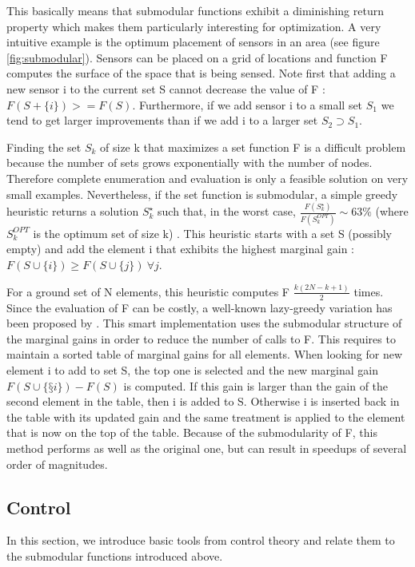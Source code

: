 \documentclass[conference]{IEEEtran}
\begin{document}
This basically means that submodular functions exhibit a diminishing return property which makes them particularly interesting for optimization. A very intuitive example is the optimum placement of sensors in an area (see figure \ref{fig:submodular}). Sensors can be placed on a grid of locations and function F computes the surface of the space that is being sensed. Note first that adding a new sensor i to the current set S cannot decrease the value of F : $F(S+\{i\})>=F(S)$. Furthermore, if we add sensor i to a small set $S_1$ we tend to get larger improvements than if we add i to a larger set $S_2 \supset S_1$.

Finding the set $ S_k $ of size k that maximizes a set function F is a difficult problem because the number of sets grows exponentially with the number of nodes. Therefore complete enumeration and evaluation is only a feasible solution on very small examples. Nevertheless, if the set function is submodular, a simple greedy heuristic returns a solution $ S_k^{\star} $ such that, in the worst case, $ \frac{F(S_k^{\star})}{F(S_k^{OPT})} \sim 63\%$ (where $ S_k^{OPT}$ is the optimum set of size k) \cite{Krause2014}. This heuristic starts with a set S (possibly empty) and add the element i that exhibits the highest marginal gain : $ F(S \cup \{i\}) \geq F(S \cup \{j\})\ \forall j $.

For a ground set of N elements, this heuristic computes F $ \frac{k(2 N - k + 1)}{2} $ times. Since the evaluation of F can be costly, a well-known lazy-greedy variation has been proposed by \cite{Minoux}. This smart implementation uses the submodular structure of the marginal gains in order to reduce the number of calls to F. This requires to maintain a sorted table of marginal gains for all elements. When looking for new element i to add to set S, the top one is selected and the new marginal gain $F(S\cup \{§i\}) - F(S)$ is computed. If this gain is larger than the  gain of the second element in the table, then i is added to S. Otherwise i is inserted back in the table with its updated gain and the same treatment is applied to the element that is now on the top of the table. Because of the submodularity of F, this method performs as well as the original one, but can result in speedups of several order of magnitudes.


\subsection{Control}

In this section, we introduce basic tools from control theory and relate them to the submodular functions introduced above. 
\end{document}
